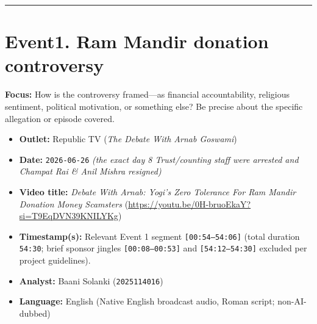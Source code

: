 \documentclass[10pt,a4paper]{article}
\begin{document}
\vspace{4pt}\noindent\rule{\textwidth}{0.4pt}\vspace{4pt}

\section*{Event1. Ram Mandir donation controversy}
\textbf{Focus:} How is the controversy framed---as financial accountability, religious sentiment, political motivation, or something else? Be precise about the specific allegation or episode covered.

\begin{itemize}[leftmargin=1.5em, itemsep=3pt, topsep=4pt]
  \item \textbf{Outlet:} Republic TV (\textit{The Debate With Arnab Goswami})
  \item \textbf{Date:} \texttt{2026-06-26} \textit{(the exact day 8 Trust/counting staff were arrested and Champat Rai \& Anil Mishra resigned)}
  \item \textbf{Video title:} \textit{Debate With Arnab: Yogi's Zero Tolerance For Ram Mandir Donation Money Scamsters} (\url{https://youtu.be/0H-bruoEkaY?si=T9EqDVN39KNILYKg})
  \item \textbf{Timestamp(s):} Relevant Event 1 segment \texttt{[00:54--54:06]} (total duration \texttt{54:30}; brief sponsor jingles \texttt{[00:08--00:53]} and \texttt{[54:12--54:30]} excluded per project guidelines).
  \item \textbf{Analyst:} Baani Solanki (\texttt{2025114016})
  \item \textbf{Language:} English (Native English broadcast audio, Roman script; non-AI-dubbed)
\end{itemize}
\end{document}
